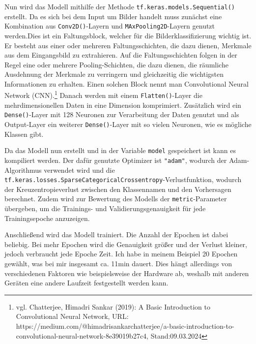 \documentclass[11pt,oneside]{report}
\begin{document}
Nun wird das Modell mithilfe der Methode \verb+tf.keras.models.Sequential()+ erstellt. Da es sich bei dem Input um Bilder handelt muss zunächst eine Kombination aus \verb+Conv2D()+-Layern und \verb+MAxPooling2D+-Layern genutzt werden.Dies ist ein Faltungsblock, welcher für die Bilderklassifizierung wichtig ist. Er besteht aus einer oder mehreren Faltungsschichten, die dazu dienen, Merkmale aus dem Eingangsbild zu extrahieren. Auf die Faltungsschichten folgen in der Regel eine oder mehrere Pooling-Schichten, die dazu dienen, die räumliche Ausdehnung der Merkmale zu verringern und gleichzeitig die wichtigsten Informationen zu erhalten. Einen solchen Block nennt man Convolutional Neural Network (CNN).\footnote{vgl. Chatterjee, Himadri Sankar (2019): A Basic Introduction to Convolutional Neural Network, URL: https://medium.com/@himadrisankarchatterjee/a-basic-introduction-to-convolutional-neural-network-8e39019b27c4, Stand:09.03.2024} Danach werden mit einem \verb+Flatten()+-Layer die mehrdimensionellen Daten in eine Dimension komprimiert. Zusätzlich wird ein \verb+Dense()+-Layer mit 128 Neuronen zur Verarbeitung der Daten genutzt und als Output-Layer ein weiterer \verb+Dense()+-Layer mit so vielen Neuronen, wie es mögliche Klassen gibt.

Da das Modell nun erstellt und in der Variable \verb+model+ gespeichert ist kann es kompiliert werden. Der dafür genutzte Optimizer ist \verb+"adam"+, wodurch der Adam-Algorithmus verwendet wird und die \verb+tf.keras.losses.SparseCategoricalCrossentropy+-Verlustfunktion, wodurch der Kreuzentropieverlust zwischen den Klassennamen und den Vorhersagen berechnet. Zudem wird zur Bewertung des Modells der \verb+metric+-Parameter übergeben, um die Trainings- und Validierungsgenauigkeit für jede Trainingsepoche anzuzeigen.

Anschließend wird das Modell trainiert. Die Anzahl der Epochen ist dabei beliebig. Bei mehr Epochen wird die Genauigkeit größer und der Verlust kleiner, jedoch verbraucht jede Epoche Zeit. Ich habe in meinem Beispiel 20 Epochen gewählt, was bei mir insgesamt ca. 11min dauert. Dies hängt allerdings von verschiedenen Faktoren wie beispielsweise der Hardware ab, weshalb mit anderen Geräten eine andere Laufzeit festgestellt werden kann.
\end{document}
